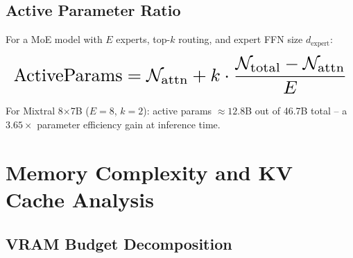 \documentclass[11pt,a4paper]{article}
\begin{document}
\subsection{Active Parameter Ratio}


For a MoE model with $E$ experts, top-$k$ routing, and expert FFN size $d_{\text{expert}}$:



























\begin{equation}
\resizebox{\columnwidth}{!}{$\displaystyle
\begin{aligned}
\text{ActiveParams} = \mathcal{N}_{\text{attn}} + k \cdot \frac{\mathcal{N}_{\text{total}} - \mathcal{N}_{\text{attn}}}{E}
\end{aligned}
$}
\end{equation}



























For Mixtral 8$\times$7B ($E = 8$, $k = 2$): active params $\approx 12.8$B out of 46.7B total -- a $3.65\times$ parameter efficiency gain at inference time.




\section{Memory Complexity and KV Cache Analysis}



\subsection{VRAM Budget Decomposition}
\end{document}
